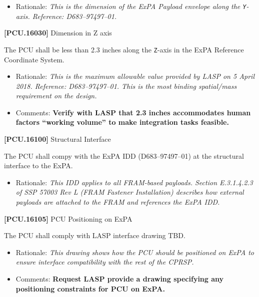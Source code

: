\begin{itemize}
\item{} Rationale: \emph{This is the dimension of the ExPA Payload envelope along the \texttt{Y}-axis. Reference: D683--97497--01.}

\end{itemize}

\textbf{[PCU.16030]} Dimension in Z axis

The \gls{PCU} shall be less than 2.3 inches along the \texttt{Z}-axis in the \gls{ExPA} Reference Coordinate System.

\begin{itemize}
\item{} Rationale: \emph{This is the maximum allowable value provided by LASP on 5 April 2018. Reference: D683--97497--01. This is the most binding spatial\slash mass requirement on the design.}

\item{} Comments: \textbf{Verify with LASP that 2.3 inches accommodates human factors ``working volume'' to make integration tasks feasible.}

\end{itemize}

\textbf{[PCU.16100]} Structural Interface

The \gls{PCU} shall compy with the \gls{ExPA} \gls{IDD} (D683--97497--01) at the structural interface to the \gls{ExPA}.

\begin{itemize}
\item{} Rationale: \emph{This IDD applies to all FRAM-based payloads. Section E.3.1.4.2.3 of SSP 57003 Rev L (FRAM Fastener Installation) describes how external payloads are attached to the FRAM and references the ExPA IDD.}

\end{itemize}

\textbf{[PCU.16105]} \gls{PCU} Positioning on \gls{ExPA}

The \gls{PCU} shall comply with \gls{LASP} interface drawing TBD\label{tbx_8}.

\begin{itemize}
\item{} Rationale: \emph{This drawing shows how the PCU should be positioned on ExPA to ensure interface compatibility with the rest of the CPRSP.}

\item{} Comments: \textbf{Request LASP provide a drawing specifying any positioning constraints for PCU on ExPA.}

\end{itemize}

